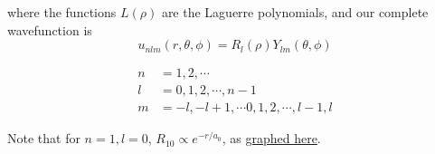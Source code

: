 where the functions \(L(\rho)\) are the Laguerre polynomials, and our complete wavefunction is
\begin{equation}\label{eqn:PHY356FLecture10:330}
u_{nlm}(r, \theta, \phi) = R_l(\rho) Y_{lm}(\theta, \phi)
\end{equation}

\begin{align}\label{eqn:PHY356FLecture10:340}
n &= 1, 2, \cdots \\
l &= 0, 1, 2, \cdots, n-1 \\
m &= -l, -l+1, \cdots 0, 1, 2, \cdots, l-1, l
\end{align}

Note that for \(n=1, l=0\), \(R_{10} \propto e^{-r/a_0}\), as \href{http://www.wolframalpha.com/input/?i=graph+e^{-r}}{graphed here}.

